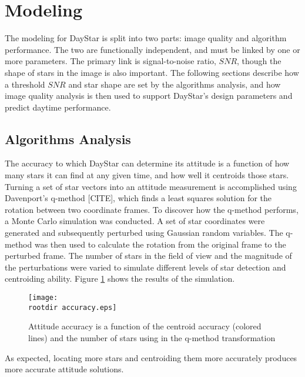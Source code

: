 \documentclass[twocolumn,letterpaper]{IEEEAerospace2012}
\newcommand{\rootdir}{./Figures/}
\newcommand{\SNR}{\mathit{SNR}}
\begin{document}
\section{Modeling}
The modeling for DayStar is split into two parts: image quality and algorithm performance. The two are functionally independent, and must be linked by one or more parameters. The primary link is signal-to-noise ratio, $\SNR$, though the shape of stars in the image is also important. The following sections describe how a threshold $\SNR$ and star shape are set by the algorithms analysis, and how image quality analysis is then used to support DayStar's design parameters and predict daytime performance.

\subsection{Algorithms Analysis}
The accuracy to which DayStar can determine its attitude is a function of how many stars it can find at any given time, and how well it centroids those stars. Turning a set of star vectors into an attitude measurement is accomplished using Davenport's q-method [CITE], which finds a least squares solution for the rotation between two coordinate frames. To discover how the q-method performs, a Monte Carlo simulation was conducted. A set of star coordinates were generated and subsequently perturbed using Gaussian random variables. The q-method was then used to calculate the rotation from the original frame to the perturbed frame. The number of stars in the field of view and the magnitude of the perturbations were varied to simulate different levels of star detection and centroiding ability. Figure \ref{fig:accuracy} shows the results of the simulation.
\begin{figure}[H]
    \label{fig:accuracy}
    \texttt{[image: \\rootdir accuracy.eps]}
    \caption{Attitude accuracy is a function of the centroid accuracy (colored lines) and the number of stars using in the q-method transformation}
\end{figure}
As expected, locating more stars and centroiding them more accurately produces more accurate attitude solutions.
\end{document}
